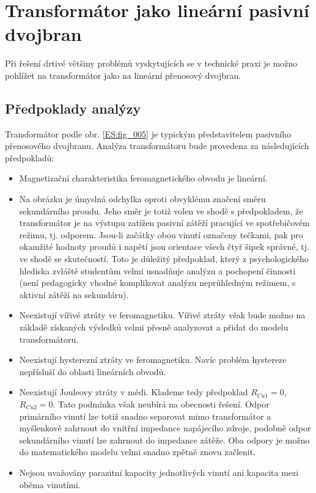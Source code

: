 {  %
  \section{Transformátor jako lineární pasivní dvojbran}
    Při řešení drtivé většiny problémů vyskytujících se v technické praxi je možno pohlížet na
    transformátor jako na lineární přenosový dvojbran.  
    \subsection{Předpoklady analýzy}
      Transformátor podle obr. \ref{ES:fig_005} je typickým představitelem  pasivního 
      přenosového dvojbranu. Analýza transformátoru bude provedena za následujících předpokladů:
      \begin{itemize}\addtolength{\itemsep}{-0.5\baselineskip}
        \item Magnetizační charakteristika feromagnetického obvodu je lineární.
        \item Na obrázku je úmyslná odchylka oproti obvyklému značení směru sekundárního proudu.  
              Jeho směr je totiž volen ve shodě s předpokladem, že transformátor je na výstupu 
              zatížen pasivní zátěží pracující ve spotřebičovém režimu, tj. odporem. Jsou-li 
              začátky obou vinutí označeny tečkami, pak pro okamžité hodnoty proudů i napětí jsou 
              orientace všech čtyř šipek správné, tj. ve shodě se skutečností. Toto je důležitý 
              předpoklad, který z psychologického hlediska zvláště studentům velmi usnadňuje 
              analýzu a pochopení činnosti (není pedagogicky vhodné komplikovat analýzu 
              neprůhledným režimem, s aktivní zátěží na sekundáru).
        \item Neexistují vířivé ztráty ve feromagnetiku. Vířivé ztráty však bude možno na základě
              získaných výsledků velmi přesně analyzovat a přidat do modelu transformátoru.
        \item Neexistují hysterezní ztráty ve feromagnetiku. Navíc problém hystereze nepřísluší do
              oblasti lineárních obvodů.
        \item Neexistují Jouleovy ztráty v mědi. Klademe tedy předpoklad \(R_{Cu1} = 0\), \(R_{Cu2}
              = 0\). Tato podmínka však neubírá na obecnosti řešení. Odpor primárního vinutí lze 
              totiž snadno separovat mimo transformátor a myšlenkově zahrnout do vnitřní impedance 
              napájecího zdroje, podobně odpor sekundárního vinutí lze zahrnout do impedance 
              zátěže. Oba odpory je možno do matematického modelu velmi snadno zpětně znovu 
              začlenit.
        \item Nejsou uvažovány parazitní kapacity jednotlivých vinutí ani kapacita mezi oběma vinutími.
      \end{itemize}
      
}
